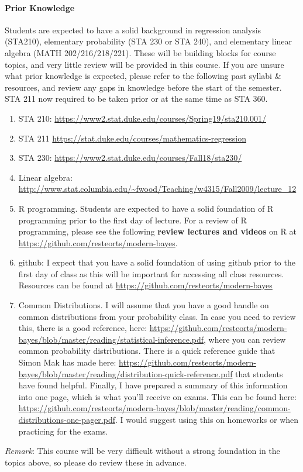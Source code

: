 \documentclass[11pt]{article}
\begin{document}
\paragraph{Prior Knowledge}
Students are expected to have a solid background in regression analysis (STA210), elementary probability (STA 230 or STA 240), and elementary linear algebra (MATH 202/216/218/221). These will be building blocks for course topics, and very little review will be provided in this course.  If you are unsure what prior knowledge is expected, please refer to the following past syllabi \& resources, and review any gaps in knowledge before the start of the semester. STA 211 now required to be taken prior or at the same time as STA 360. 
\begin{enumerate}
\item STA 210: \url{https://www2.stat.duke.edu/courses/Spring19/sta210.001/}
\item STA 211 \url{https://stat.duke.edu/courses/mathematics-regression}
\item STA 230: \url{https://www2.stat.duke.edu/courses/Fall18/sta230/}
\item Linear algebra: \url{http://www.stat.columbia.edu/~fwood/Teaching/w4315/Fall2009/lecture_12}
\item R programming. Students are expected to have a solid foundation of R programming prior to the first day of lecture. For a review of R programming, please see the following \textbf{review lectures and videos} on R at \url{https://github.com/resteorts/modern-bayes}.
\item github: I expect that you have a solid foundation of using github prior to the first day of class as this will be important for accessing all class resources.  Resources can be found at \url{https://github.com/resteorts/modern-bayes}
\item Common Distributions. I will assume that you have a good handle on common distributions from your probability class. In case you need to review this, there is a good reference, here: \url{https://github.com/resteorts/modern-bayes/blob/master/reading/statistical-inference.pdf}, where you can review common probability distributions. There is a quick reference guide that Simon Mak has made here: \url{https://github.com/resteorts/modern-bayes/blob/master/reading/distribution-quick-reference.pdf} that students have found helpful. Finally, I have prepared a summary of this information into one page, which is what you'll receive on exams. This can be found here: \url{https://github.com/resteorts/modern-bayes/blob/master/reading/common-distributions-one-pager.pdf}. I would suggest using this on homeworks or when practicing for the exams. 
\end{enumerate}
\emph{Remark}: This course will be very difficult without a strong foundation in the topics above, so please do review these in advance. 
\end{document}
